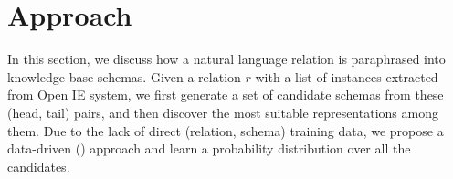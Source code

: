 \section{Approach}
\label{sec:approach}


In this section, we discuss how a natural language relation
is paraphrased into knowledge base schemas.
Given a relation $r$ with a list of instances extracted from Open IE system,
we first generate a set of candidate schemas from these (head, tail) pairs,
and then discover the most suitable representations among them.
Due to the lack of direct (relation, schema) training data, 
we propose a data-driven ()
approach and learn a probability distribution over all the candidates.

%
%
%





%
%
